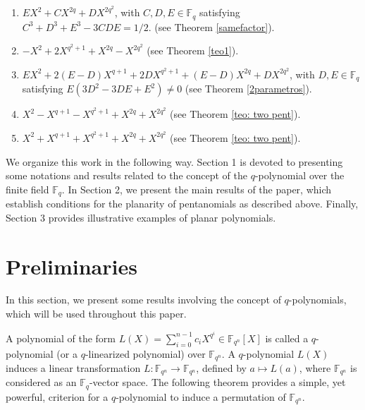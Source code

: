 \documentclass[12pt]{amsart}
\begin{document}
	  \begin{enumerate}  	
	  	\item  $EX^2 + CX^{2q} +DX^{2q^2}$, with $C, D, E \in \mathbb{F}_q$ satisfying $C^3 + D^3 + E^3 - 3CDE=1/2$. (see Theorem \ref{samefactor}).
	  	\item $-X^2 + 2X^{q^2+1} + X^{2q} - X^{2q^2}$ (see Theorem \ref{teo1}).
		\item $EX^2 + 2(E-D)X^{q+1} + 2DX^{q^2+1} + (E-D)X^{2q} + DX^{2q^2}$,  with $ D, E \in \mathbb{F}_q$ satisfying $E(3D^2 - 3DE + E^2) \neq 0$ (see Theorem \ref{2parametros}).
			\item $X^2 - X^{q+1} - X^{q^2 + 1} + X^{2q} + X^{2q^2}$ (see Theorem \ref{teo: two pent}).
		\item $X^2 + X^{q+1} + X^{q^2 + 1} + X^{2q} + X^{2q^2}$ (see Theorem  \ref{teo: two pent}).	
	  \end{enumerate}
	  We organize this work in the following way. Section 1 is devoted to presenting some notations and results related to the concept of the $q$-polynomial over the finite field $\mathbb{F}_q$. In Section 2, we present the main results of the paper, which establish conditions for the planarity of pentanomials as described above. Finally, Section 3 provides illustrative examples of planar polynomials. 
	
	
	\section{Preliminaries}
	
	In this section, we  present some results involving the concept of $q$-polynomials, which will be used throughout this paper.
	
	A polynomial of the form $\displaystyle L(X)=\sum_{i=0}^{n-1} c_i  X^{q^i} \in \mathbb{F}_{q^n}[X]$ is called a $q$-polynomial (or a $q$-linearized polynomial) over $\mathbb{F}_{q^n}$. A $q$-polynomial $L(X)$ induces a linear transformation $L: \mathbb{F}_{q^n} \rightarrow \mathbb{F}_{q^n}$, defined by $a \mapsto L(a)$, where $\mathbb{F}_{q^n}$ is considered as an $\mathbb{F}_{q}$-vector space. The following theorem provides a simple, yet powerful, criterion for a 
$q$-polynomial to induce a permutation of $\mathbb{F}_{q^n}$.
	
\end{document}
